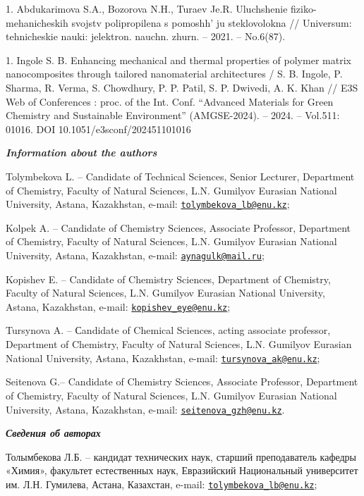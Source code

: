 1. Abdukarimova S.A., Bozorova N.H., Turaev Je.R. Uluchshenie
fiziko-mehanicheskih svojstv polipropilena s
pomoshh' ju steklovolokna // Universum: tehnicheskie
nauki: jelektron. nauchn. zhurn. -- 2021. -- No.6(87).

1. Ingole S. B. Enhancing mechanical and thermal properties of polymer
matrix nanocomposites through tailored nanomaterial architectures / S.
B. Ingole, P. Sharma, R. Verma, S. Chowdhury, P. P. Patil, S. P.
Dwivedi, A. K. Khan // E3S Web of Conferences : proc. of the Int.
Conf. ``Advanced Materials for Green Chemistry and Sustainable
Environment'' (AMGSE-2024). -- 2024. -- Vol.511: 01016. DOI
10.1051/e3sconf/202451101016

\begin{authorinfo}
\emph{{\bfseries Information about the authors}}

Tolymbekova L. -- Candidate of Technical Sciences, Senior Lecturer,
Department of Chemistry, Faculty of Natural Sciences, L.N. Gumilyov
Eurasian National University, Astana, Kazakhstan, e-mail:
\href{mailto:tolymbekova_lb@enu.kz}{\nolinkurl{tolymbekova\_lb@enu.kz}};

Kolpek A. -- Candidate of Chemistry Sciences, Associate Professor,
Department of Chemistry, Faculty of Natural Sciences, L.N. Gumilyov
Eurasian National University, Astana, Kazakhstan, e-mail:
\href{mailto:aynagulk@mail.ru}{\nolinkurl{aynagulk@mail.ru}};

Kopishev E. -- Candidate of Chemistry Sciences, Department of Chemistry,
Faculty of Natural Sciences, L.N. Gumilyov Eurasian National University,
Astana, Kazakhstan, e-mail:
\href{mailto:kopishev_eye@enu.kz}{\nolinkurl{kopishev\_eye@enu.kz}};

Tursynova A. -- Сandidate of Chemical Sciences, acting associate
professor, Department of Chemistry, Faculty of Natural Sciences, L.N.
Gumilyov Eurasian National University, Astana, Kazakhstan, e-mail:
\href{mailto:tursynova_ak@enu.kz}{\nolinkurl{tursynova\_ak@enu.kz}};

Seitenova G.-- Candidate of Chemistry Sciences, Associate Professor,
Department of Chemistry, Faculty of Natural Sciences, L.N. Gumilyov
Eurasian National University, Astana, Kazakhstan, e-mail:
\href{mailto:seitenova_gzh@enu.kz}{\nolinkurl{seitenova\_gzh@enu.kz}}.

\emph{{\bfseries Сведения об авторах}}

Толымбекова Л.Б. -- кандидат технических наук, старший преподаватель
кафедры «Химия», факультет естественных наук, Евразийский Национальный
университет им. Л.Н. Гумилева, Астана, Казахстан, e-mail:
\href{mailto:tolymbekova_lb@enu.kz}{\nolinkurl{tolymbekova\_lb@enu.kz}};


\end{authorinfo}
